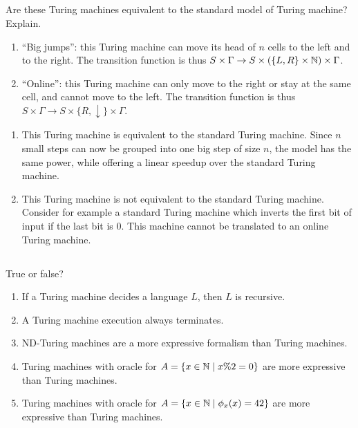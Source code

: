 \subsection{} %
Are these Turing machines equivalent to the standard model of Turing machine?
Explain.
\begin{enumerate}
	\item ``Big jumps'': this Turing machine
	can move its head of \(n\) cells to the left and to the right.
	The transition function is thus
	\(S \times \Gamma \to S \times (\{L, R\} \times \mathbb{N}) \times \Gamma\).
	\item ``Online'': this Turing machine can only move to the right
	or stay at the same cell,
	and cannot move to the left.
	The transition function is thus
	\(S \times \Gamma \to S \times \{R, \downarrow\} \times \Gamma\).
\end{enumerate}

\begin{solution}
	\begin{enumerate}
		\item This Turing machine is equivalent
		to the standard Turing machine.
		Since \(n\) small steps can now be grouped
		into one big step of size \(n\),
		the model has the same power,
		while offering a linear speedup
		over the standard Turing machine.
		\item This Turing machine is not equivalent
		to the standard Turing machine.
		Consider for example a standard Turing machine
		which inverts the first bit of input
		if the last bit is \(0\).
		This machine cannot be translated to an online Turing machine.
	\end{enumerate}
\end{solution}

\subsection{} %
True or false?
\begin{enumerate}
	\item If a Turing machine decides a language \(L\),
	then \(L\) is recursive.
	\item A Turing machine execution always terminates.
	\item ND-Turing machines are
	a more expressive formalism than Turing machines.
	\item Turing machines with oracle for
	\(A = \{x \in \mathbb{N} \mid x \% 2 = 0\}\) are
	more expressive than Turing machines.
	\item Turing machines with oracle for
	\(A = \{x \in \mathbb{N} \mid \phi_x(x) = 42\}\) are
	more expressive than Turing machines.
\end{enumerate}

